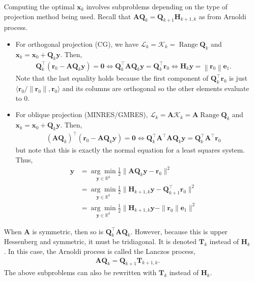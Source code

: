 \documentclass[12pt,a4paper]{article} %
\DeclareMathOperator{\Range}{Range}
\begin{document}
Computing the optimal $\bm x_k$ involves subproblems 
depending on the type of projection method being used.
Recall that $\mathbf A \mathbf Q_k = \mathbf Q_{k+1} \mathbf H_{k+1,k}$ as from 
Arnoldi process.
\begin{itemize}
    \item For orthogonal projection (CG), we have $\mathcal L_k = \mathcal K_k = \Range \mathbf Q_k$ and 
    $\bm x_k = \bm x_0 + \mathbf Q_k \bm y$. Then, 
    \begin{align*}
        \mathbf{Q}_{k}^{\top}\left(\bm{r}_{0}-\mathbf{A} \mathbf{Q}_{k} \bm{y}\right)=\mathbf{0} \Longleftrightarrow \mathbf{Q}_{k}^{\top} \mathbf{A} \mathbf{Q}_{k} \bm{y}=\mathbf{Q}_{k}^{\top} \bm{r}_{0} \Longleftrightarrow \mathbf{H}_{k} \bm{y}=\left\|\bm{r}_{0}\right\| \bm{e}_{1}.
    \end{align*}
    Note that the last equality holds because the first component
     of $\mathbf Q_k^\top \bm r_0$  is just $\langle \bm r_0 / \| \bm r_0 \|, \bm r_0\rangle$
    and its columns are orthogonal so the other elements evaluate to 0.
    \item For oblique projection (MINRES/GMRES), 
    $\mathcal L_k = \mathbf A\mathcal K_k = \mathbf A\Range \mathbf Q_k$ 
    and $\bm x_k = \bm x_0 + \mathbf Q_k \bm y$. Then, 
    \begin{align*}
        (\mathbf A \mathbf Q_k)^\top (\bm{r}_{0}-\mathbf{A} \mathbf{Q}_{k} \bm{y}) = \bm 0 \iff \mathbf Q_k^\top \mathbf A^\top \mathbf A \mathbf Q_k \bm y = \mathbf Q_k^\top \mathbf A^\top \bm r_0
    \end{align*}
    but note that this is exactly the normal equation for a least squares system. Thus, 
    \begin{align*}
        \bm y &= \underset{\bm y \in \mathbb R^k}{\arg \min} \frac{1}{2} \| \mathbf A \mathbf Q_k \bm y - \bm r_0 \|^2 \\ 
        &= \underset{\bm y \in \mathbb R^k}{\arg \min} \frac{1}{2} \| \mathbf H_{k+1,k} \bm y - \mathbf Q_{k+1}^\top\bm r_0 \|^2 \\ 
        &= \underset{\bm y \in \mathbb R^k}{\arg \min} \frac{1}{2} \Big\| \mathbf H_{k+1,k} \bm y - \|\bm r_0\| \bm e_1 \Big\|^2 
    \end{align*}
\end{itemize}
When $\mathbf A$ is symmetric, then so is $\mathbf Q_k^\top \mathbf A \mathbf Q_k$.
However, because this is upper Hessenberg and symmetric, it must be tridiagonal. 
It is denoted $\mathbf T_k$ instead of $\mathbf H_k$. In this case, the Arnoldi 
process is called the Lanczos process,
\begin{align*}
    \mathbf A \mathbf Q_{k} = \mathbf Q_{k+1} \mathbf T_{k+1,k}.
\end{align*}
The above subproblems can also  be rewritten with  $\mathbf T_k$ instead of $\mathbf H_k$.
\end{document}
